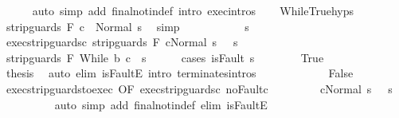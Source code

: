 \begin{isabellebody}
\ \ \ \ \isamarkupfalse%
\ {\isacharparenleft}auto\ simp\ add{\isacharcolon}\ final{\isacharunderscore}notin{\isacharunderscore}def\ intro{\isacharcolon}\ exec{\isachardot}intros{\isacharparenright}\isanewline
\ \ \isamarkupfalse%
\ WhileTrue{\isachardot}hyps\ \isamarkupfalse%
\ {\isachardoublequoteopen}{\isasymGamma}{\isasymturnstile}strip{\isacharunderscore}guards\ F\ c\ {\isasymdown}\ Normal\ s{\isachardoublequoteclose}\ \isamarkupfalse%
\ simp\isanewline
\ \ \isamarkupfalse%
\isanewline
\ \ \isacommand{{\isacharbraceleft}}\isamarkupfalse%
\isanewline
\ \ \ \ \isamarkupfalse%
\ s{\isacharprime}\isanewline
\ \ \ \ \isamarkupfalse%
\ exec{\isacharunderscore}strip{\isacharunderscore}guards{\isacharunderscore}c{\isacharcolon}\ {\isachardoublequoteopen}{\isasymGamma}{\isasymturnstile}{\isasymlangle}strip{\isacharunderscore}guards\ F\ c{\isacharcomma}Normal\ s\ {\isasymrangle}\ {\isasymRightarrow}\ s{\isacharprime}{\isachardoublequoteclose}\isanewline
\ \ \ \ \isamarkupfalse%
\ {\isachardoublequoteopen}{\isasymGamma}{\isasymturnstile}strip{\isacharunderscore}guards\ F\ {\isacharparenleft}While\ b\ c{\isacharparenright}\ {\isasymdown}\ s{\isacharprime}{\isachardoublequoteclose}\isanewline
\ \ \ \ \isamarkupfalse%
\ {\isacharparenleft}cases\ {\isachardoublequoteopen}isFault\ s{\isacharprime}{\isachardoublequoteclose}{\isacharparenright}\isanewline
\ \ \ \ \ \ \isamarkupfalse%
\ True\isanewline
\ \ \ \ \ \ \isamarkupfalse%
\ {\isacharquery}thesis\ \isamarkupfalse%
\ {\isacharparenleft}auto\ elim{\isacharcolon}\ isFaultE\ intro{\isacharcolon}\ terminates{\isachardot}intros{\isacharparenright}\isanewline
\ \ \ \ \isamarkupfalse%
\isanewline
\ \ \ \ \ \ \isamarkupfalse%
\ False\isanewline
\ \ \ \ \ \ \isamarkupfalse%
\ exec{\isacharunderscore}strip{\isacharunderscore}guards{\isacharunderscore}to{\isacharunderscore}exec\ {\isacharbrackleft}OF\ exec{\isacharunderscore}strip{\isacharunderscore}guards{\isacharunderscore}c{\isacharbrackright}\ noFault{\isacharunderscore}c\isanewline
\ \ \ \ \ \ \isamarkupfalse%
\ {\isacharasterisk}{\isacharcolon}\ {\isachardoublequoteopen}{\isasymGamma}{\isasymturnstile}{\isasymlangle}c{\isacharcomma}Normal\ s\ {\isasymrangle}\ {\isasymRightarrow}\ s{\isacharprime}{\isachardoublequoteclose}\isanewline
\ \ \ \ \ \ \ \ \isamarkupfalse%
\ {\isacharparenleft}auto\ simp\ add{\isacharcolon}\ final{\isacharunderscore}notin{\isacharunderscore}def\ elim{\isacharbang}{\isacharcolon}\ isFaultE{\isacharparenright}\isanewline

\end{isabellebody}
